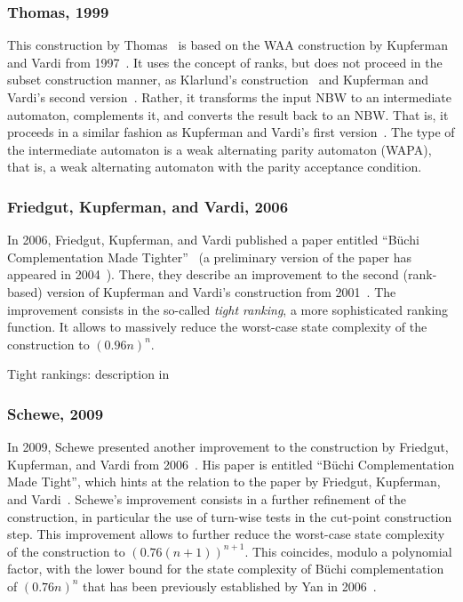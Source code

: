 \subsubsection{Thomas, 1999}
This construction by Thomas~\cite{1999_thomas} is based on the WAA construction by Kupferman and Vardi from 1997~\cite{1997_vardi}. It uses the concept of ranks, but does not proceed in the subset construction manner, as Klarlund's construction~\cite{1991_klarlund} and Kupferman and Vardi's second version~\cite{Kupferman:2001}. Rather, it transforms the input NBW to an intermediate automaton, complements it, and converts the result back to an NBW. That is, it proceeds in a similar fashion as Kupferman and Vardi's first version~\cite{1997_vardi}. The type of the intermediate automaton is a weak alternating parity automaton (WAPA), that is, a weak alternating automaton with the parity acceptance condition.

\subsubsection{Friedgut, Kupferman, and Vardi, 2006}
In 2006, Friedgut, Kupferman, and Vardi published a paper entitled ``Büchi Complementation Made Tighter''~\cite{friedgut2006buchi} (a preliminary version of the paper has appeared in 2004~\cite{2004_friedgut}). There, they describe an improvement to the second (rank-based) version of Kupferman and Vardi's construction from 2001~\cite{Kupferman:2001}. The improvement consists in the so-called \textit{tight ranking}, a more sophisticated ranking function. It allows to massively reduce the worst-case state complexity of the construction to $(0.96n)^n$.

Tight rankings: description in \cite{fogarty2013unifying}~\cite{2007_vardi}

\subsubsection{Schewe, 2009}
In 2009, Schewe presented another improvement to the construction by Friedgut, Kupferman, and Vardi from 2006~\cite{schewe2009buchi}. His paper is entitled ``Büchi Complementation Made Tight'', which hints at the relation to the paper by Friedgut, Kupferman, and Vardi~\cite{friedgut2006buchi}. Schewe's improvement consists in a further refinement of the construction, in particular the use of turn-wise tests in the cut-point construction step. This improvement allows to further reduce the worst-case state complexity of the construction to $\left(0.76\left(n+1\right)\right)^{n+1}$. This coincides, modulo a polynomial factor, with the lower bound for the state complexity of Büchi complementation of $(0.76n)^n$ that has been previously established by Yan in 2006~\cite{2006_yan}\cite{DBLP:journals/corr/abs-0802-1226}.

